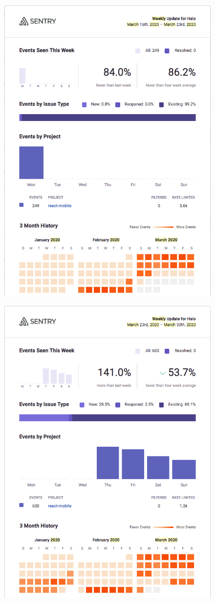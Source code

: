 \begin{figure}[htbp!]
\centering
\begin{minipage}{.5\textwidth}
  \centering
  \includegraphics[width=.8\linewidth]{images/localhalo/sentry-weekly-report-16-mar-2020.png}
  \label{fig:localhalo-sentry-weekly-report-16-mar-2020}
\end{minipage}%
\begin{minipage}{.5\textwidth}
  \centering
  \includegraphics[width=.8\linewidth]{images/localhalo/sentry-weekly-report-23-mar-2020.png}

\end{minipage}
\end{figure}
